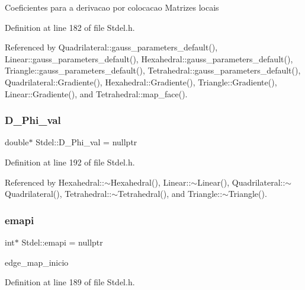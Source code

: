 Coeficientes para a derivacao por colocacao Matrizes locais 

Definition at line 182 of file Stdel.\+h.



Referenced by Quadrilateral\+::gauss\+\_\+parameters\+\_\+default(), Linear\+::gauss\+\_\+parameters\+\_\+default(), Hexahedral\+::gauss\+\_\+parameters\+\_\+default(), Triangle\+::gauss\+\_\+parameters\+\_\+default(), Tetrahedral\+::gauss\+\_\+parameters\+\_\+default(), Quadrilateral\+::\+Gradiente(), Hexahedral\+::\+Gradiente(), Triangle\+::\+Gradiente(), Linear\+::\+Gradiente(), and Tetrahedral\+::map\+\_\+face().

\mbox{\label{classStdel_a80a6c89c61bfef1160257e97b3ffb0a2}} 
\subsubsection{\texorpdfstring{D\+\_\+\+Phi\+\_\+val}{D\_Phi\_val}}
{\footnotesize\ttfamily double$\ast$ Stdel\+::\+D\+\_\+\+Phi\+\_\+val = nullptr\hspace{0.3cm}{\ttfamily [protected]}}



Definition at line 192 of file Stdel.\+h.



Referenced by Hexahedral\+::$\sim$\+Hexahedral(), Linear\+::$\sim$\+Linear(), Quadrilateral\+::$\sim$\+Quadrilateral(), Tetrahedral\+::$\sim$\+Tetrahedral(), and Triangle\+::$\sim$\+Triangle().

\mbox{\label{classStdel_a9ba8eb743aeb36984b7c4ececa837e16}} 
\subsubsection{\texorpdfstring{emapi}{emapi}}
{\footnotesize\ttfamily int$\ast$ Stdel\+::emapi = nullptr\hspace{0.3cm}{\ttfamily [protected]}}



edge\+\_\+map\+\_\+inicio 



Definition at line 189 of file Stdel.\+h.



